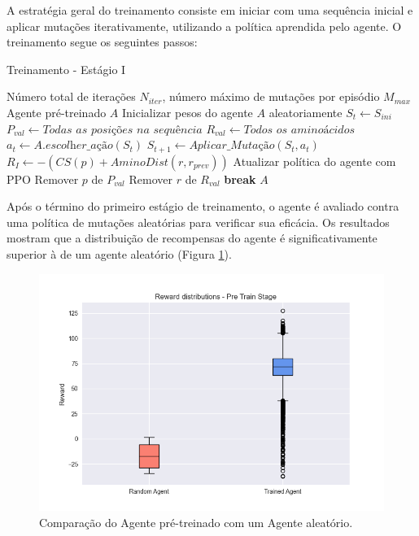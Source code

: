 A estratégia geral do treinamento consiste em iniciar com uma sequência inicial 
e aplicar mutações iterativamente, 
utilizando a política aprendida pelo agente. 
O treinamento segue os seguintes passos:

\begin{algorithm}
  \caption{Treinamento - Estágio I}
  \label{alg:train_stage1}
  \begin{algorithmic}[1]
  \Require Número total de iterações $N_{iter}$, número máximo de mutações por episódio $M_{max}$
  \Ensure Agente pré-treinado $A$
  \State Inicializar pesos do agente $A$ aleatoriamente
      \State $S_{t} \gets S_{ini}$ 
      \State $P_{val} \gets \textit{Todas as posições na sequência}$
      \State $R_{val} \gets \textit{Todos os aminoácidos}$
          \State $a_{t} \gets A.\textit{escolher\_ação}(S_{t})$
          \State $S_{t+1} \gets \textit{Aplicar\_Mutação}(S_{t}, a_{t})$
          \State $R_{I} \gets -(CS(p) + AminoDist(r, r_{prev}))$
          \State Atualizar política do agente com PPO
              \State Remover $p$ de $P_{val}$
          \EndIf
              \State Remover $r$ de $R_{val}$
          \EndIf
              \State \textbf{break}
          \EndIf
      \EndFor
  \EndFor
  \Return $A$
  \end{algorithmic}
\end{algorithm}

Após o término do primeiro estágio de treinamento, o agente é avaliado contra uma política de mutações aleatórias para verificar sua eficácia. Os resultados mostram que a distribuição de recompensas do agente é significativamente superior à de um agente aleatório (Figura \ref{fig:box-pre-train}).

\begin{figure}[H]
  \centering
  \includegraphics[width=.8\linewidth]{figuras/plot_box_pre_train_reward.jpg}  
  \caption{Comparação do Agente pré-treinado com um Agente aleatório.}
  \label{fig:box-pre-train}
\end{figure}

